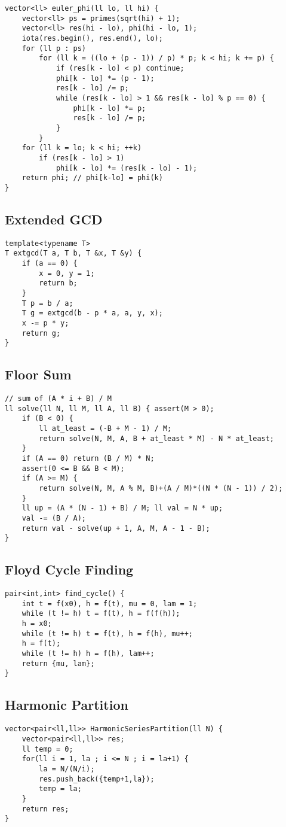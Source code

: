 \documentclass[landscape, 8pt, a4paper, oneside]{extarticle}
\begin{document}
\begin{multicols}{3}
\begin{verbatim}
vector<ll> euler_phi(ll lo, ll hi) {
    vector<ll> ps = primes(sqrt(hi) + 1);
    vector<ll> res(hi - lo), phi(hi - lo, 1);
    iota(res.begin(), res.end(), lo);
    for (ll p : ps)
        for (ll k = ((lo + (p - 1)) / p) * p; k < hi; k += p) {
            if (res[k - lo] < p) continue;
            phi[k - lo] *= (p - 1);
            res[k - lo] /= p;
            while (res[k - lo] > 1 && res[k - lo] % p == 0) {
                phi[k - lo] *= p;
                res[k - lo] /= p;
            }
        }
    for (ll k = lo; k < hi; ++k)
        if (res[k - lo] > 1)
            phi[k - lo] *= (res[k - lo] - 1);
    return phi; // phi[k-lo] = phi(k)
}
\end{verbatim}
\subsection{Extended GCD}
\begin{verbatim}
template<typename T>
T extgcd(T a, T b, T &x, T &y) {
    if (a == 0) {
        x = 0, y = 1;
        return b;
    }
    T p = b / a;
    T g = extgcd(b - p * a, a, y, x);
    x -= p * y;
    return g;
}
\end{verbatim}
\subsection{Floor Sum}
\begin{verbatim}
// sum of (A * i + B) / M
ll solve(ll N, ll M, ll A, ll B) { assert(M > 0);
    if (B < 0) {
        ll at_least = (-B + M - 1) / M;
        return solve(N, M, A, B + at_least * M) - N * at_least;
    }
    if (A == 0) return (B / M) * N;
    assert(0 <= B && B < M);
    if (A >= M) {
        return solve(N, M, A % M, B)+(A / M)*((N * (N - 1)) / 2);
    }
    ll up = (A * (N - 1) + B) / M; ll val = N * up;
    val -= (B / A);
    return val - solve(up + 1, A, M, A - 1 - B);
}
\end{verbatim}
\subsection{Floyd Cycle Finding}
\begin{verbatim}
pair<int,int> find_cycle() {
    int t = f(x0), h = f(t), mu = 0, lam = 1;
    while (t != h) t = f(t), h = f(f(h));
    h = x0;
    while (t != h) t = f(t), h = f(h), mu++;
    h = f(t);
    while (t != h) h = f(h), lam++;
    return {mu, lam};
}    
\end{verbatim}
\subsection{Harmonic Partition}
\begin{verbatim}
vector<pair<ll,ll>> HarmonicSeriesPartition(ll N) {
    vector<pair<ll,ll>> res;
    ll temp = 0;
    for(ll i = 1, la ; i <= N ; i = la+1) {
        la = N/(N/i);
        res.push_back({temp+1,la});
        temp = la;
    }
    return res;
}
\end{verbatim}

\end{multicols}
\end{document}
